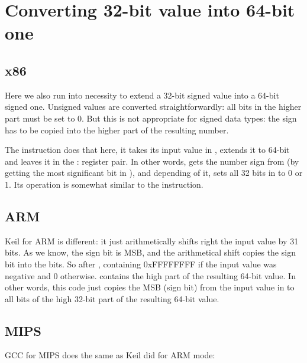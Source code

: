 ﻿\section{Converting 32-bit value into 64-bit one}
\label{subsec:sign_extending_32_to_64}



\subsection{x86}



Here we also run into necessity to extend a 32-bit signed value into a 64-bit signed one.
Unsigned values are converted straightforwardly: all bits in the higher part must be set to 0.
But this is not appropriate for signed data types: the sign has to be copied into the higher part of the resulting number.

The  instruction does that here, it takes its input value in \EAX{}, extends it to 64-bit and leaves it
in the \EDX{}:\EAX{} register pair.
In other words,  gets the number sign from \EAX{} (by getting the
most significant bit in \EAX{}), and depending of it, sets all 32 bits in \EDX{} to 0 or 1.
Its operation is somewhat
similar to the \MOVSX{} instruction.

\subsection{ARM}



Keil for ARM is different: it just arithmetically shifts right the input value by 31 bits.
As we know, the sign bit is \ac{MSB}, and the arithmetical shift copies the sign bit into the  bits.
So after ,  containing 0xFFFFFFFF if the input value was negative and 0 otherwise.
 contains the high part of the resulting 64-bit value.
In other words, this code just copies the \ac{MSB} (sign bit) from the input value in  to all bits of the high 32-bit part of the resulting 64-bit value.

\subsection{MIPS}

GCC for MIPS does the same as Keil did for ARM mode:


